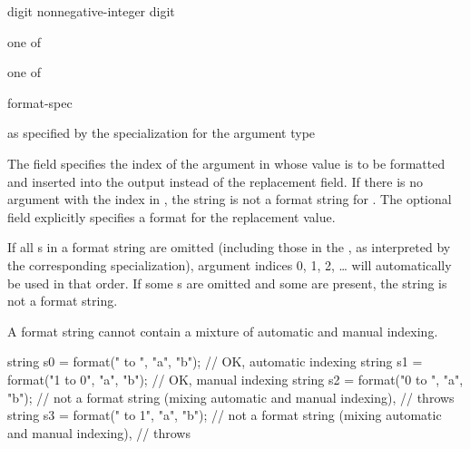 \begin{ncbnf}
\br
    digit\br
    nonnegative-integer digit
\end{ncbnf}

\begin{ncbnf}
 \textnormal{one of}\br
\end{ncbnf}

\begin{ncbnf}
 \textnormal{one of}\br
\end{ncbnf}

\begin{ncbnf}
\br
    \terminal{:} format-spec
\end{ncbnf}

\begin{ncbnf}
\br
    \textnormal{as specified by the  specialization for the argument type}
\end{ncbnf}

\pnum
The  field specifies the index of
the argument in 
whose value is to be formatted and inserted into the output
instead of the replacement field.
If there is no argument with
the index  in ,
the string is not a format string for .
The optional  field
explicitly specifies a format for the replacement value.

\pnum
\begin{example}
\begin{codeblock}
string s = format("{0}-{{", 8);         // value of  is 
\end{codeblock}
\end{example}

\pnum
If all s in a format string are omitted
(including those in the ,
as interpreted by the corresponding  specialization),
argument indices 0, 1, 2, \ldots{} will automatically be used in that order.
If some s are omitted and some are present,
the string is not a format string.
\begin{note}
A format string cannot contain a
mixture of automatic and manual indexing.
\end{note}
\begin{example}
\begin{codeblock}
string s0 = format("{} to {}",   "a", "b"); // OK, automatic indexing
string s1 = format("{1} to {0}", "a", "b"); // OK, manual indexing
string s2 = format("{0} to {}",  "a", "b"); // not a format string (mixing automatic and manual indexing),
                                            // throws 
string s3 = format("{} to {1}",  "a", "b"); // not a format string (mixing automatic and manual indexing),
                                            // throws 
\end{codeblock}
\end{example}

